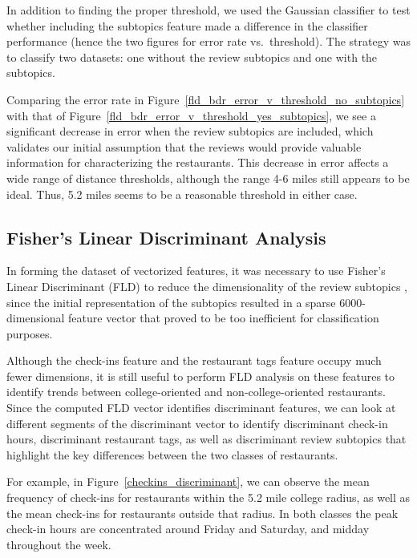 \documentclass[10pt,twocolumn,letterpaper]{article}
\begin{document}
In addition to finding the proper threshold, we used the Gaussian classifier to
test whether including the subtopics feature made a difference in the classifier
performance (hence the two figures for error rate vs.\ threshold). The strategy
was to classify two datasets: one without the review subtopics and one with the
subtopics.

Comparing the error rate in Figure~\ref{fld_bdr_error_v_threshold_no_subtopics}
with that of Figure~\ref{fld_bdr_error_v_threshold_yes_subtopics}, we see a
significant decrease in error when the review subtopics are included, which
validates our initial assumption that the reviews would provide valuable
information for characterizing the restaurants. This decrease in error affects a
wide range of distance thresholds, although the range 4-6 miles still appears to
be ideal. Thus, 5.2 miles seems to be a reasonable threshold in either case.

\subsection{Fisher's Linear Discriminant Analysis}

In forming the dataset of vectorized features, it was necessary to use Fisher's
Linear Discriminant (FLD) to reduce the dimensionality of the review subtopics
\cite{FLD_kernels}, since the initial representation of the subtopics resulted
in a sparse 6000-dimensional feature vector that proved to be too inefficient
for classification purposes.

Although the check-ins feature and the restaurant tags feature occupy much fewer
dimensions, it is still useful to perform FLD analysis on these features to
identify trends between college-oriented and non-college-oriented restaurants.
Since the computed FLD vector identifies discriminant features, we can look at
different segments of the discriminant vector to identify discriminant check-in
hours, discriminant restaurant tags, as well as discriminant review subtopics
that highlight the key differences between the two classes of restaurants.

For example, in Figure~\ref{checkins_discriminant}, we can observe the mean
frequency of check-ins for restaurants within the 5.2 mile college radius, as
well as the mean check-ins for restaurants outside that radius. In both classes
the peak check-in hours are concentrated around Friday and Saturday, and midday
throughout the week.
\end{document}
